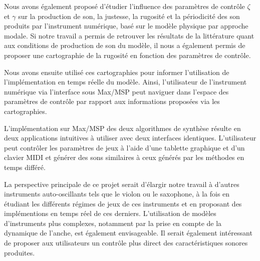 \documentclass[french, twocolumn]{article}
\begin{document}
Nous avons également proposé d'étudier l'influence des paramètres de contrôle $\zeta$ et $\gamma$ sur la production de son, la justesse, la rugosité et la périodicité des son produits par l'instrument numérique, basé sur le modèle physique par approche modale. Si notre travail a permis de retrouver les résultats de la littérature quant aux conditions de production de son du modèle, il nous a également permis de proposer une cartographie de la rugosité en fonction des paramètres de contrôle. 


Nous avons ensuite utilisé ces cartographies pour informer l'utilisation de l'implémentation en temps réelle du modèle. Ainsi, l'utilisateur de l'instrument numérique via l'interface sous Max/MSP peut naviguer dans l'espace des paramètres de contrôle par rapport aux informations proposées via les cartographies. 

L'implémentation sur Max/MSP des deux algorithmes de synthèse résulte en deux applications intuitives à utiliser avec deux interfaces identiques. L'utilisateur peut contrôler les paramètres de jeux à l'aide d'une tablette graphique et d'un clavier MIDI et générer des sons similaires à ceux générés par les méthodes en temps différé.

La perspective principale de ce projet serait d'élargir notre travail à d'autres instruments auto-oscillants tels que le violon ou le saxophone, à la fois en étudiant les différents régimes de jeux de ces instruments et en proposant des implémentions en temps réel de ces derniers. L'utilisation de modèles d'instruments plus complexes, notamment par la prise en compte de la dynamique de l'anche, est également envisageable. Il serait également intéressant de proposer aux utilisateurs un contrôle plus direct des caractéristiques sonores produites. 



 {\hypersetup{hidelinks} \printbibliography }
\end{document}
